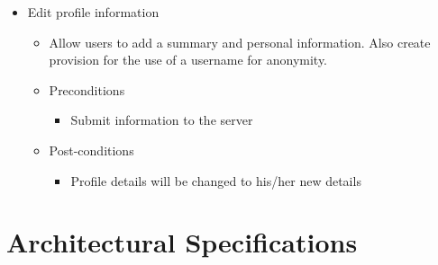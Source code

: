 \documentclass{article}
\begin{document}
\begin{itemize}
			
				\item Edit profile information
				\begin{itemize}
					\item Allow users to add a summary and personal information. Also create provision for the use of a username for anonymity.
					\item Preconditions
					\begin{itemize}
						\item Submit information to the server
					\end{itemize}
					\item Post-conditions
					\begin{itemize}
						\item Profile details will be changed to his/her new details
					\end{itemize}
					\end{itemize}
				\end{itemize}
				
				
           			
  \section{Architectural Specifications}
\end{document}
